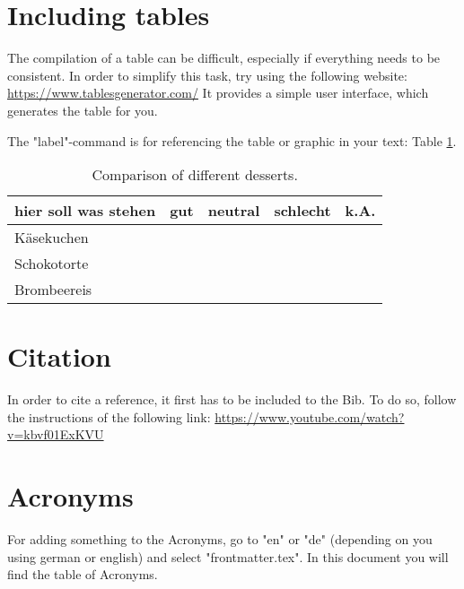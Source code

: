 \section{Including tables}

The compilation of a table can be difficult, especially if everything needs to be consistent. In order to simplify this task, try using the following website: \url{https://www.tablesgenerator.com/}
It provides a simple user interface, which generates the table for you.

The "label"-command is for referencing the table or graphic in your text: Table \ref{desserts}.

\begin{table}[H]
    \caption{Comparison of different desserts.}
    \label{desserts}
    \centering
    \begin{tabular}{@{}lllll@{}}
        \toprule
        hier soll was stehen & gut & neutral & schlecht & k.A. \\ \midrule
        Käsekuchen           &     &         &          &      \\
        Schokotorte          &     &         &          &      \\
        Brombeereis          &     &         &          &      \\ \bottomrule
    \end{tabular}
\end{table}



\section{Citation}

In order to cite a reference, it first has to be included to the Bib. To do so, follow the instructions of the following link: \url{https://www.youtube.com/watch?v=kbvf01ExKVU}


\section{Acronyms}

For adding something to the Acronyms, go to "en" or "de" (depending on you using german or english) and select "frontmatter.tex". In this document you will find the table of Acronyms.
